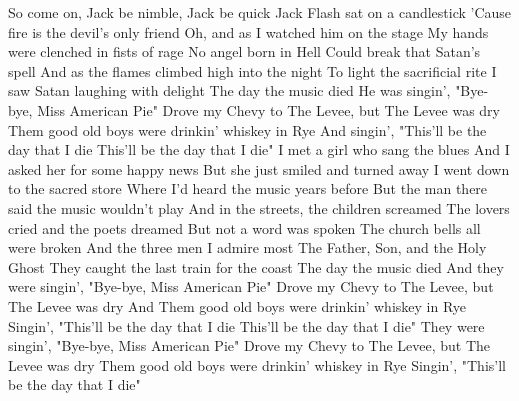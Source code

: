 \documentclass[../../songbookMain]{subfiles}
\begin{document}
\begin{guitar}
\begin{multicols}{2}
So come on, Jack be nimble, Jack be quick
Jack Flash sat on a candlestick
'Cause fire is the devil's only friend
Oh, and as I watched him on the stage
My hands were clenched in fists of rage
No angel born in Hell
Could break that Satan's spell
And as the flames climbed high into the night
To light the sacrificial rite
I saw Satan laughing with delight
The day the music died
He was singin', "Bye-bye, Miss American Pie"
Drove my Chevy to The Levee, but The Levee was dry
Them good old boys were drinkin' whiskey in Rye
And singin', "This'll be the day that I die
This'll be the day that I die"
I met a girl who sang the blues
And I asked her for some happy news
But she just smiled and turned away
I went down to the sacred store
Where I'd heard the music years before
But the man there said the music wouldn't play
And in the streets, the children screamed
The lovers cried and the poets dreamed
But not a word was spoken
The church bells all were broken
And the three men I admire most
The Father, Son, and the Holy Ghost
They caught the last train for the coast
The day the music died
And they were singin', "Bye-bye, Miss American Pie"
Drove my Chevy to The Levee, but The Levee was dry
And Them good old boys were drinkin' whiskey in Rye
Singin', "This'll be the day that I die
This'll be the day that I die"
They were singin', "Bye-bye, Miss American Pie"
Drove my Chevy to The Levee, but The Levee was dry
Them good old boys were drinkin' whiskey in Rye
Singin', "This'll be the day that I die"
\end{multicols}

\end{guitar}
\end{document}
